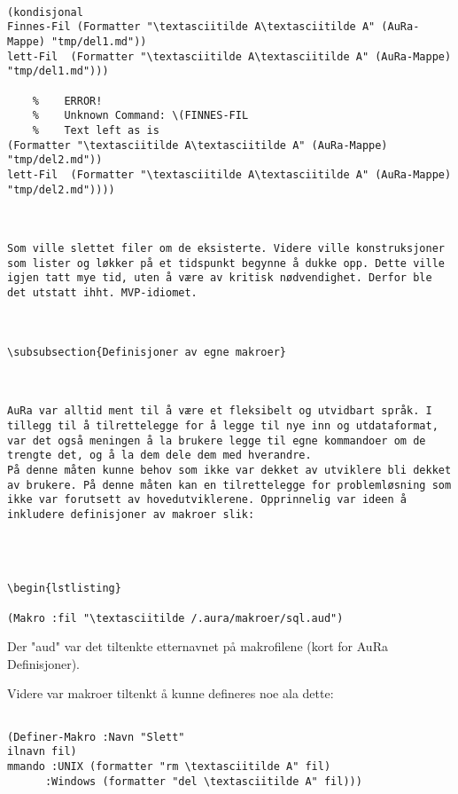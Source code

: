 \documentclass[11pt]{article}
\begin{document}
\begin{lstlisting}

(kondisjonal
Finnes-Fil (Formatter "\textasciitilde A\textasciitilde A" (AuRa-Mappe) "tmp/del1.md"))
lett-Fil  (Formatter "\textasciitilde A\textasciitilde A" (AuRa-Mappe) "tmp/del1.md")))

    %    ERROR!
    %    Unknown Command: \(FINNES-FIL
    %    Text left as is
(Formatter "\textasciitilde A\textasciitilde A" (AuRa-Mappe) "tmp/del2.md"))
lett-Fil  (Formatter "\textasciitilde A\textasciitilde A" (AuRa-Mappe) "tmp/del2.md"))))



Som ville slettet filer om de eksisterte. Videre ville konstruksjoner som lister og løkker på et tidspunkt begynne å dukke opp. Dette ville igjen tatt mye tid, uten å være av kritisk nødvendighet. Derfor ble det utstatt ihht. MVP-idiomet.



\subsubsection{Definisjoner av egne makroer}



AuRa var alltid ment til å være et fleksibelt og utvidbart språk. I tillegg til å tilrettelegge for å legge til nye inn og utdataformat, var det også meningen å la brukere legge til egne kommandoer om de trengte det, og å la dem dele dem med hverandre.
På denne måten kunne behov som ikke var dekket av utviklere bli dekket av brukere. På denne måten kan en tilrettelegge for problemløsning som ikke var forutsett av hovedutviklerene. Opprinnelig var ideen å inkludere definisjoner av makroer slik:




\begin{lstlisting}

(Makro :fil "\textasciitilde /.aura/makroer/sql.aud")
\end{lstlisting}




Der "aud" var det tiltenkte etternavnet på makrofilene (kort for AuRa Definisjoner).



Videre var makroer tiltenkt å kunne defineres noe ala dette:




\begin{lstlisting}

(Definer-Makro :Navn "Slett"
ilnavn fil)
mmando :UNIX (formatter "rm \textasciitilde A" fil)
      :Windows (formatter "del \textasciitilde A" fil))) 
\end{lstlisting}
\end{document}

